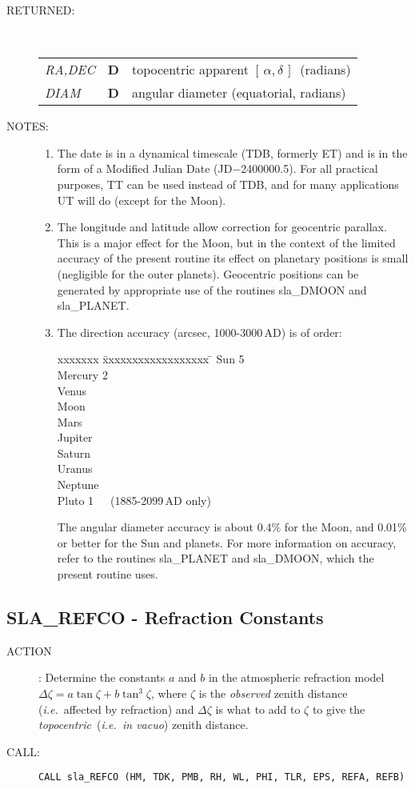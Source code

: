 \documentclass[11pt,twoside]{article}
\newcommand{\xlabel}[1]{}
\newcommand{\radec}     {$[\,\alpha,\delta\,]$}
\newcommand{\routine}[3]
{\hbadness=10000
  \vbox
  {
    \rule{\textwidth}{0.3mm}\\
    {\Large {\bf #1} \hfill #2 \hfill {\bf #1}}\\
    \setlength{\oldspacing}{\topsep}
    \setlength{\topsep}{0.3ex}
    \begin{description}
      #3
    \end{description}
    \setlength{\topsep}{\oldspacing}
  }
}
\renewcommand{\routine}[3]
   {
      \subsection{#1\xlabel{#1} - #2\label{#1}}
       \begin{description}
         #3
       \end{description}
   }
\newcommand{\action}[1]
{\item[ACTION]: #1}
\newcommand{\action}[1]
   {\item[ACTION:] #1}
\newcommand{\call}[1]
{\item[CALL]: \hspace{0.4em}{\tt #1}}
\newlength{\oldspacing}
\renewcommand{\call}[1]
   {
    \item[CALL:] {\tt #1}
   }
\newcommand{\args}[2]
{
  \goodbreak
  \setlength{\oldspacing}{\topsep}
  \setlength{\topsep}{0.3ex}
  \begin{description}
  \item[#1]:\\[1.5ex]
    \begin{tabular}{p{7em}p{6em}p{22em}}
      #2
    \end{tabular}
  \end{description}
  \setlength{\topsep}{\oldspacing}
}
\renewcommand{\args}[2]
   {
     \begin{description}
        \item[#1:]\\
        \begin{tabular}{p{7em}p{6em}l}
           #2
        \end{tabular}
     \end{description}
   }
\newcommand{\spec}[3]
{
  {\em {#1}} & {\bf \mbox{#2}} & {#3}
}
\newcommand{\notes}[1]
{
  \goodbreak
  \setlength{\oldspacing}{\topsep}
  \setlength{\topsep}{0.3ex}
  \begin{description}
    \item[NOTES]:
        #1
  \end{description}
  \setlength{\topsep}{\oldspacing}
}
\renewcommand{\notes}[1]
   {
      \begin{description}
         \item[NOTES:]
            #1
      \end{description}
   }
\begin{document}
\args{RETURNED}
{
 \spec{RA,DEC}{D}{topocentric apparent \radec\ (radians)} \\
 \spec{DIAM}{D}{angular diameter (equatorial, radians)}
}
\notes
{
 \begin{enumerate}
  \item The date is in a dynamical timescale (TDB, formerly ET)
        and is in the form of a Modified
        Julian Date (JD$-$2400000.5).  For all practical purposes, TT can
        be used instead of TDB, and for many applications UT will do
        (except for the Moon).
  \item The longitude and latitude allow correction for geocentric
        parallax.  This is a major effect for the Moon, but in the
        context of the limited accuracy of the present routine its
        effect on planetary positions is small (negligible for the
        outer planets).  Geocentric positions can be generated by
        appropriate use of the routines sla\_DMOON and sla\_PLANET.
  \item The direction accuracy (arcsec, 1000-3000\,AD) is of order:
        \begin{tabbing}
         xxxxxxx \= xxxxxxxxxxxxxxxxxx \= \kill
         \> Sun     \>  \hspace{0.5em}5 \\
         \> Mercury \>  \hspace{0.5em}2 \\
         \> Venus   \> 10 \\
         \> Moon    \> 30 \\
         \> Mars    \> 50 \\
         \> Jupiter \> 90 \\
         \> Saturn  \> 90 \\
         \> Uranus  \> 90 \\
         \> Neptune \> 10 \\
         \> Pluto \> \hspace{0.5em}1~~~(1885-2099\,AD only)
        \end{tabbing}
        The angular diameter accuracy is about 0.4\% for the Moon,
        and 0.01\% or better for the Sun and planets.
        For more information on accuracy,
        refer to the routines sla\_PLANET and sla\_DMOON,
        which the present routine uses.
 \end{enumerate}
}
\routine{SLA\_REFCO}{Refraction Constants}
{
 \action{Determine the constants $a$ and $b$ in the
         atmospheric refraction model
         $\Delta \zeta = a \tan \zeta + b \tan^{3} \zeta$,
         where $\zeta$ is the {\it observed}\/ zenith distance
         ({\it i.e.}\ affected by refraction) and $\Delta \zeta$ is
         what to add to $\zeta$ to give the {\it topocentric}\,
         ({\it i.e.\ in vacuo}) zenith distance.}
 \call{CALL sla\_REFCO (HM, TDK, PMB, RH, WL, PHI, TLR, EPS, REFA, REFB)}
}
\end{document}
